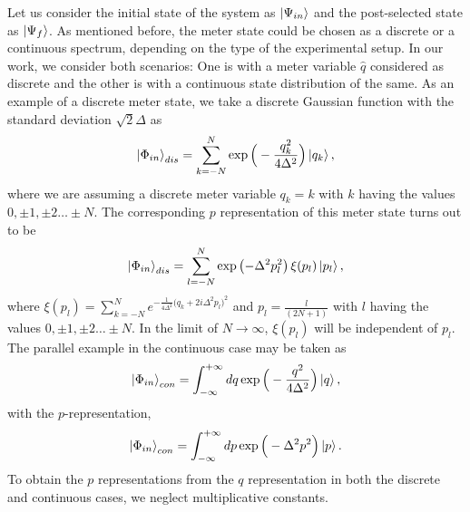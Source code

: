 \documentclass[aps,pra,showpacs,twoside,twocolumn,10pt]{revtex4-1}
\begin{document}
Let us consider the initial state of the system as $\ket{\Psi_{in}}$ and the post-selected state as $\ket{\Psi_f}$. As mentioned before, the meter state could be chosen as a discrete or a continuous spectrum, depending on the type of the experimental setup. In our work, we consider both scenarios: One is with a meter variable $\hat{q}$ considered as discrete and the other is with a continuous state distribution of the same. As an example of a discrete meter state, we take a discrete Gaussian function with the standard deviation $\sqrt{2}\Delta$ as
\begin{equation}
\label{eq:dis}
\ket{\Phi_{in}}_{dis}= \sum_{k=-N}^{N}\exp \Big ( -\frac{q_k^2}{4\Delta^2}\Big)\ket{q_k},
\end{equation}
where we are assuming a discrete meter variable $q_k=k$ with $k$ having the values $0, \pm 1, \pm 2\ldots \pm N$. The corresponding $p$ representation of this meter state turns out to be
\begin{equation}
    \ket{\Phi_{in}}_{dis}=\sum_{l=-N}^{N} \exp \left ( -\Delta^2 p_l^2\right)\xi(p_l)\ket{p_l},
\end{equation}
where $\xi(p_l)=\sum_{k=-N}^{N} e^{-\frac{1}{4\Delta^2}\big(q_k+2i\Delta^2 p_l\big)^2}$ and $p_l=\frac{l}{(2N+1)}$ with $l$ having the values $0, \pm 1, \pm 2\ldots \pm N$.
In the limit of $N \rightarrow \infty$, $\xi(p_l)$ will be independent of $p_l$. %
The parallel example in the continuous case may be taken as 
\begin{equation}
\ket{\Phi_{in}}_{con}= \int_{-\infty}^{+\infty} dq\exp \Big ( -\frac{q^2}{4\Delta^2}\Big)\ket{q},
\label{eq:meter} 
\end{equation}
with the $p$-representation,
\begin{equation}
\ket{\Phi_{in}}_{con}= \int_{-\infty}^{+\infty} dp\exp \Big ( -\Delta^2 p^2\Big)\ket{p}.
\label{eq:meterp} 
\end{equation}
To obtain the $p$ representations from the $q$ representation in both the discrete and  continuous cases, we neglect multiplicative constants.
\end{document}
